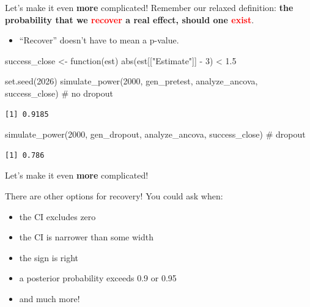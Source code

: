 \documentclass[
  ignorenonframetext,
  aspectratio=169,
]{beamer}
\newenvironment{Shaded}{\begin{snugshade}}{\end{snugshade}}
\newcommand{\CommentTok}[1]{\textcolor[rgb]{0.37,0.37,0.37}{#1}}
\newcommand{\ControlFlowTok}[1]{\textcolor[rgb]{0.00,0.23,0.31}{#1}}
\newcommand{\DecValTok}[1]{\textcolor[rgb]{0.68,0.00,0.00}{#1}}
\newcommand{\FloatTok}[1]{\textcolor[rgb]{0.68,0.00,0.00}{#1}}
\newcommand{\FunctionTok}[1]{\textcolor[rgb]{0.28,0.35,0.67}{#1}}
\newcommand{\NormalTok}[1]{\textcolor[rgb]{0.00,0.23,0.31}{#1}}
\newcommand{\OtherTok}[1]{\textcolor[rgb]{0.00,0.23,0.31}{#1}}
\newcommand{\SpecialCharTok}[1]{\textcolor[rgb]{0.37,0.37,0.37}{#1}}
\newcommand{\StringTok}[1]{\textcolor[rgb]{0.13,0.47,0.30}{#1}}
\providecommand{\tightlist}{%
  \setlength{\itemsep}{0pt}\setlength{\parskip}{0pt}}\usepackage{longtable,booktabs,array}
\begin{document}
\begin{frame}[fragile]{Let's make it even \textbf{more} complicated!}
\label{lets-make-it-even-more-complicated-4}
Remember our relaxed definition:
\textbf{the probability that we \textcolor{red}{recover} a real effect, should one \textcolor{red}{exist}}.

\begin{itemize}
\tightlist
\item
  ``Recover'' doesn't have to mean a p-value.
\end{itemize}

\begin{Shaded}
\begin{Highlighting}[]
\NormalTok{success\_close }\OtherTok{\textless{}{-}} \ControlFlowTok{function}\NormalTok{(est) }\FunctionTok{abs}\NormalTok{(est[[}\StringTok{"Estimate"}\NormalTok{]] }\SpecialCharTok{{-}} \DecValTok{3}\NormalTok{) }\SpecialCharTok{\textless{}} \FloatTok{1.5}

\FunctionTok{set.seed}\NormalTok{(}\DecValTok{2026}\NormalTok{)}
\FunctionTok{simulate\_power}\NormalTok{(}\DecValTok{2000}\NormalTok{, gen\_pretest, analyze\_ancova, success\_close) }\CommentTok{\# no dropout}
\end{Highlighting}
\end{Shaded}

\begin{verbatim}
[1] 0.9185
\end{verbatim}

\begin{Shaded}
\begin{Highlighting}[]
\FunctionTok{simulate\_power}\NormalTok{(}\DecValTok{2000}\NormalTok{, gen\_dropout, analyze\_ancova, success\_close) }\CommentTok{\# dropout}
\end{Highlighting}
\end{Shaded}

\begin{verbatim}
[1] 0.786
\end{verbatim}
\end{frame}

\begin{frame}{Let's make it even \textbf{more} complicated!}
\label{lets-make-it-even-more-complicated-5}
\large

There are other options for recovery! You could ask when:

\begin{itemize}
\tightlist
\item
  the CI excludes zero
\item
  the CI is narrower than some width
\item
  the sign is right
\item
  a posterior probability exceeds 0.9 or 0.95
\item
  and much more!
\end{itemize}
\end{frame}
\end{document}
